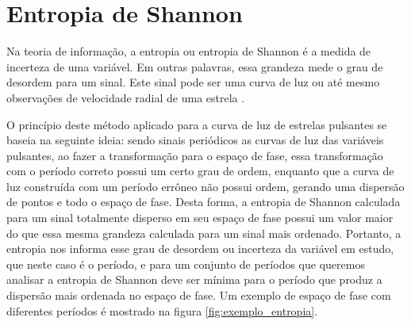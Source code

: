 %
%
%
%

\section{Entropia de Shannon}

Na teoria de informação, a entropia ou entropia de Shannon \citep{informationTheory} é a medida de incerteza de uma variável. Em outras palavras, essa grandeza mede o grau de desordem para um sinal. Este sinal pode ser uma curva de luz ou até mesmo observações de velocidade radial de uma estrela \citep{entropy}. %

O princípio deste método aplicado para a curva de luz de estrelas pulsantes se baseia na seguinte ideia: sendo sinais periódicos as curvas de luz das variáveis pulsantes, ao fazer a transformação para o espaço de fase, essa transformação com o período correto possui um certo grau de ordem, enquanto que a curva de luz construída com um período errôneo não possui ordem, gerando uma dispersão de pontos e todo o espaço de fase. Desta forma, a entropia de Shannon calculada para um sinal totalmente disperso em seu espaço de fase possui um valor maior do que essa mesma grandeza calculada para um sinal mais ordenado. Portanto, a entropia nos informa esse grau de desordem ou incerteza da variável em estudo, que neste caso é o período, e para um conjunto de períodos que queremos analisar a entropia de Shannon deve ser mínima para o período que produz a dispersão mais ordenada no espaço de fase. Um exemplo de espaço de fase com diferentes períodos é mostrado na figura \ref{fig:exemplo_entropia}.


